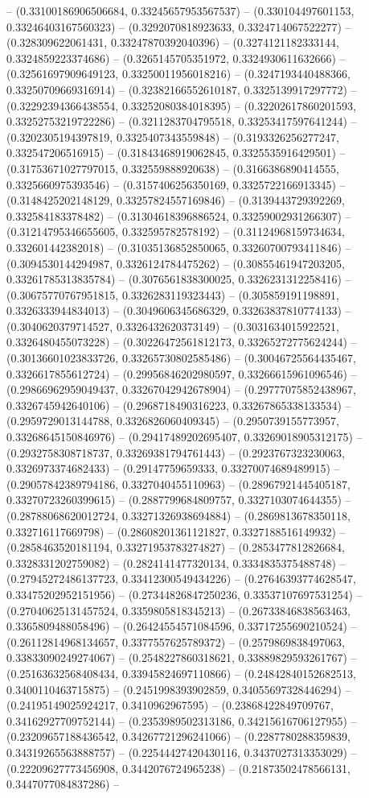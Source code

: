 -- (0.33100186906506684, 0.33245657953567537) -- (0.330104497601153, 0.33246403167560323) -- (0.3292070818923633, 0.3324714067522277) -- (0.328309622061431, 0.33247870392040396) -- (0.3274121182333144, 0.3324859223374686) -- (0.3265145705351972, 0.3324930611632666) -- (0.32561697909649123, 0.33250011956018216) -- (0.3247193440488366, 0.33250709669316914) -- (0.32382166552610187, 0.3325139917297772) -- (0.32292394366438554, 0.33252080384018395) -- (0.32202617860201593, 0.33252753219722286) -- (0.3211283704795518, 0.33253417597641244) -- (0.3202305194397819, 0.3325407343559848) -- (0.3193326256277247, 0.332547206516915) -- (0.31843468919062845, 0.3325535916429501) -- (0.31753671027797015, 0.332559888920638) -- (0.3166386890414555, 0.3325660975393546) -- (0.3157406256350169, 0.3325722166913345) -- (0.3148425202148129, 0.33257824557169846) -- (0.3139443729392269, 0.332584183378482) -- (0.31304618396886524, 0.33259002931266307) -- (0.31214795346655605, 0.332595782578192) -- (0.31124968159734634, 0.332601442382018) -- (0.31035136852850065, 0.33260700793411846) -- (0.3094530144294987, 0.3326124784475262) -- (0.30855461947203205, 0.33261785313835784) -- (0.3076561838300025, 0.3326231312258416) -- (0.30675770767951815, 0.3326283119323443) -- (0.305859191198891, 0.3326333944834013) -- (0.3049606345686329, 0.33263837810774133) -- (0.3040620379714527, 0.3326432620373149) -- (0.3031634015922521, 0.3326480455073228) -- (0.30226472561812173, 0.33265272775624244) -- (0.30136601023833726, 0.33265730802585486) -- (0.30046725564435467, 0.3326617855612724) -- (0.29956846202980597, 0.33266615961096546) -- (0.29866962959049437, 0.33267042942678904) -- (0.29777075852438967, 0.3326745942640106) -- (0.2968718490316223, 0.33267865338133534) -- (0.2959729013144788, 0.3326826060409345) -- (0.2950739155773957, 0.33268645150846976) -- (0.29417489202695407, 0.33269018905312175) -- (0.2932758308718737, 0.33269381794761443) -- (0.2923767323230063, 0.3326973374682433) -- (0.29147759659333, 0.33270074689489915) -- (0.29057842389794186, 0.3327040455110963) -- (0.28967921445405187, 0.33270723260399615) -- (0.2887799684809757, 0.3327103074644355) -- (0.28788068620012724, 0.33271326938694884) -- (0.2869813678350118, 0.332716117669798) -- (0.28608201361121827, 0.3327188516149932) -- (0.2858463520181194, 0.33271953783274827) -- (0.2853477812826684, 0.3328331202759082) -- (0.2824141477320134, 0.3334835375488748) -- (0.27945272486137723, 0.33412300549434226) -- (0.27646393774628547, 0.33475202952151956) -- (0.27344826847250236, 0.33537107697531254) -- (0.27040625131457524, 0.3359805818345213) -- (0.26733846838563463, 0.3365809488058496) -- (0.26424554571084596, 0.33717255690210524) -- (0.26112814968134657, 0.3377557625789372) -- (0.2579869838497063, 0.33833090249274067) -- (0.2548227860318621, 0.33889829593261767) -- (0.25163632568408434, 0.33945824697110866) -- (0.24842840152682513, 0.3400110463715875) -- (0.2451998393902859, 0.34055697328446294) -- (0.24195149025924217, 0.3410962967595) -- (0.23868422849709767, 0.34162927709752144) -- (0.2353989502313186, 0.34215616706127955) -- (0.23209657188436542, 0.34267721296241066) -- (0.2287780288359839, 0.34319265563888757) -- (0.22544427420430116, 0.3437027313353029) -- (0.22209627773456908, 0.3442076724965238) -- (0.21873502478566131, 0.3447077084837286) -- 